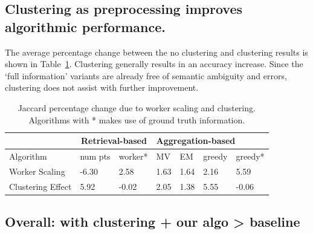 \subsection{Clustering as preprocessing improves algorithmic performance.}
\par \noindent The average percentage change between the no clustering and clustering results is shown in Table~\ref{statsTable}. Clustering generally results in an accuracy increase. Since the `full information' variants are already free of semantic ambiguity and errors, clustering does not assist with further improvement. %
\begin{table}[h!]
   \small
      \begin{tabular}{l|l|l|l|l|l|l}
         & \multicolumn{2}{c|}{Retrieval-based} & \multicolumn{4}{l}{Aggregation-based} \\ \hline
      Algorithm         & num pts         & worker*        & MV    & EM    & greedy  & greedy*  \\ \hline
      Worker Scaling    & -6.30           & 2.58               & 1.63  & 1.64  & 2.16    & 5.59         \\ \hline
      Clustering Effect & 5.92            & -0.02              & 2.05  & 1.38  & 5.55    & -0.06       
      \end{tabular}
      \vspace{10pt}
      \caption{Jaccard percentage change due to worker scaling and clustering. Algorithms with * makes use of ground truth information.}
      \label{statsTable}
\end{table}

\subsection{Overall: with clustering + our algo > baseline}